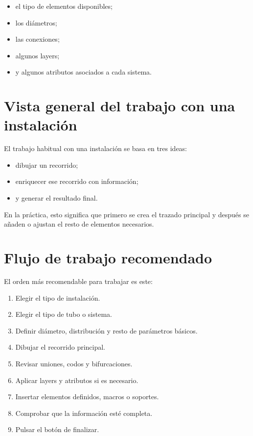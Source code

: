 \begin{itemize}
\item el tipo de elementos disponibles;
\item los diámetros;
\item las conexiones;
\item algunos layers;
\item y algunos atributos asociados a cada sistema.
\end{itemize}

\section{Vista general del trabajo con una instalación}

El trabajo habitual con una instalación se basa en tres ideas:

\begin{itemize}
\item dibujar un recorrido;
\item enriquecer ese recorrido con información;
\item y generar el resultado final.
\end{itemize}

En la práctica, esto significa que primero se crea el trazado principal y después se añaden o ajustan el resto de elementos necesarios.


\section{Flujo de trabajo recomendado}

El orden más recomendable para trabajar es este:

\begin{enumerate}
\item Elegir el tipo de instalación.
\item Elegir el tipo de tubo o sistema.
\item Definir diámetro, distribución y resto de parámetros básicos.
\item Dibujar el recorrido principal.
\item Revisar uniones, codos y bifurcaciones.
\item Aplicar layers y atributos si es necesario.
\item Insertar elementos definidos, macros o soportes.
\item Comprobar que la información esté completa.
\item Pulsar el botón de finalizar.
\end{enumerate}

